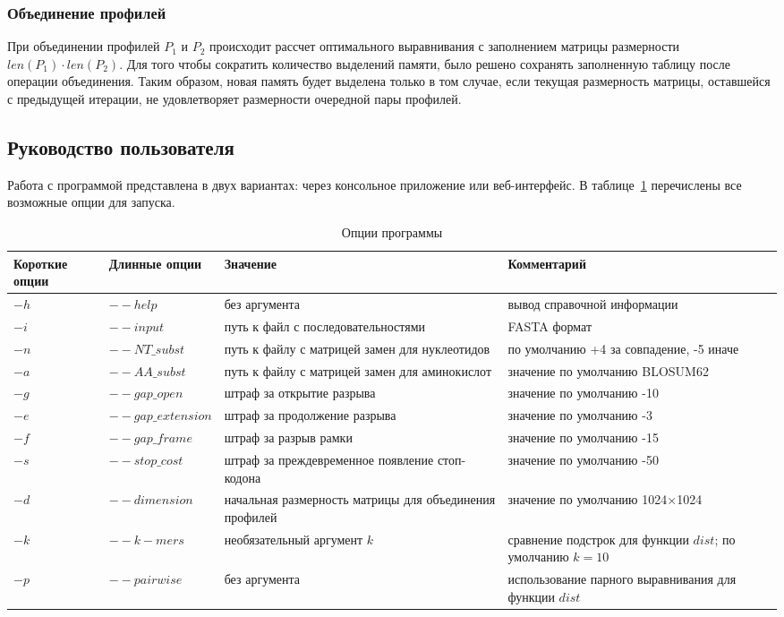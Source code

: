 \subsubsection[Объединение профилей]{\large Объединение профилей}
\hspace{\parindent} При объединении профилей $P_1$ и $P_2$ происходит рассчет оптимального выравнивания с заполнением матрицы размерности $len(P_1) \cdot len(P_2)$. Для того чтобы сократить количество выделений памяти, было решено сохранять заполненную таблицу после операции объединения. Таким образом, новая память будет выделена только в том случае, если текущая размерность матрицы, оставшейся с предыдущей итерации, не удовлетворяет размерности очередной пары профилей.

\subsection[Руководство пользователя]{\large Руководство пользователя}
\hspace{\parindent} Работа с программой представлена в двух вариантах: через консольное приложение или веб-интерфейс. В таблице~\ref{tabular:options} перечислены все возможные опции для запуска.
\begin{table}[H]
\caption{Опции программы}
\label{tabular:options}
\begin{center}
\begin{tabular}{|p{2.4cm}|p{3.5cm}|p{5.2cm}|p{4.4cm}|}
\hline
Короткие опции& Длинные опции& Значение& Комментарий\\
\hline
$-h$& $--help$& без аргумента& вывод справочной информации\\
\hline
$-i$& $--input$& путь к файл с последовательностями & FASTA формат\\
\hline
$-n$& $--NT\_subst$& путь к файлу с матрицей замен для нуклеотидов & по умолчанию +4 за совпадение, -5 иначе\\
\hline
$-a$& $--AA\_subst$& путь к файлу с матрицей замен для аминокислот& значение по умолчанию BLOSUM62\\
\hline
$-g$& $--gap\_open$& штраф за открытие разрыва& значение по умолчанию -10\\
\hline
$-e$ & $--gap\_extension$& штраф за продолжение разрыва& значение по умолчанию -3\\
\hline
$-f$& $--gap\_frame$& штраф за разрыв рамки& значение по умолчанию -15\\
\hline
$-s$& $--stop\_cost$& штраф за преждевременное появление стоп-кодона& значение по умолчанию -50\\
\hline
$-d$& $--dimension$& начальная размерность матрицы для объединения профилей& значение по умолчанию 1024$\times$1024\\
\hline
$-k$& $--k-mers$& необязательный аргумент $k$& сравнение подстрок для функции $dist$; по умолчанию $k=10$ \\
\hline
$-p$& $--pairwise$& без аргумента& использование парного выравнивания для функции $dist$\\
\hline
\end{tabular}
\end{center}
\end{table}

